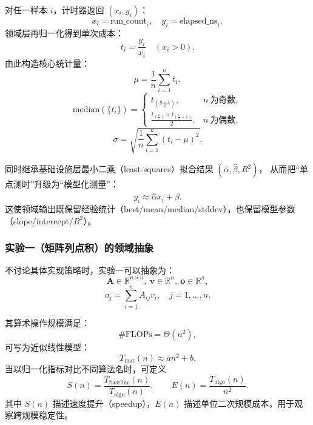 对任一样本 \(i\)，计时器返回 \((x_i, y_i)\)：
\begin{equation}
 x_i = \text{run\_count}_i,\quad y_i = \text{elapsed\_ns}_i,
\end{equation}
领域层再归一化得到单次成本：
\begin{equation}
 t_i = \frac{y_i}{x_i} \quad (x_i > 0).
\end{equation}
由此构造核心统计量：
\begin{equation}
\mu = \frac{1}{n}\sum_{i=1}^{n} t_i,
\end{equation}
\begin{equation}
\mathrm{median}(\{t_i\})=
\begin{cases}
 t_{(\frac{n+1}{2})}, & n\ \text{为奇数},\\
 \frac{t_{(\frac{n}{2})}+t_{(\frac{n}{2}+1)}}{2}, & n\ \text{为偶数},
\end{cases}
\end{equation}
\begin{equation}
\sigma = \sqrt{\frac{1}{n}\sum_{i=1}^{n}(t_i-\mu)^2}.
\end{equation}

同时继承基础设施层最小二乘（least-squares）拟合结果 \((\hat\alpha, \hat\beta, R^2)\)，
从而把“单点测时”升级为“模型化测量”：
\begin{equation}
 y_i \approx \hat\alpha x_i + \hat\beta.
\end{equation}
这使领域输出既保留经验统计（best/mean/median/stddev），也保留模型参数（slope/intercept/\(R^2\)）。

\subsubsection{实验一（矩阵列点积）的领域抽象}

不讨论具体实现策略时，实验一可以抽象为：
\begin{equation}
\mathbf{A}\in\mathbb{R}^{n\times n},\ \mathbf{v}\in\mathbb{R}^{n},\ \mathbf{o}\in\mathbb{R}^{n},
\end{equation}
\begin{equation}
 o_j = \sum_{i=1}^{n} A_{ij}v_i,\quad j=1,\dots,n.
\end{equation}

其算术操作规模满足：
\begin{equation}
\#\mathrm{FLOPs} = \Theta(n^2),
\end{equation}
可写为近似线性模型：
\begin{equation}
 T_{\text{mat}}(n) \approx a n^2 + b.
\end{equation}
当以归一化指标对比不同算法名时，可定义
\begin{equation}
S(n)=\frac{T_{\text{baseline}}(n)}{T_{\text{algo}}(n)},\qquad
E(n)=\frac{T_{\text{algo}}(n)}{n^2}.
\end{equation}
其中 \(S(n)\) 描述速度提升（speedup），\(E(n)\) 描述单位二次规模成本，用于观察跨规模稳定性。

